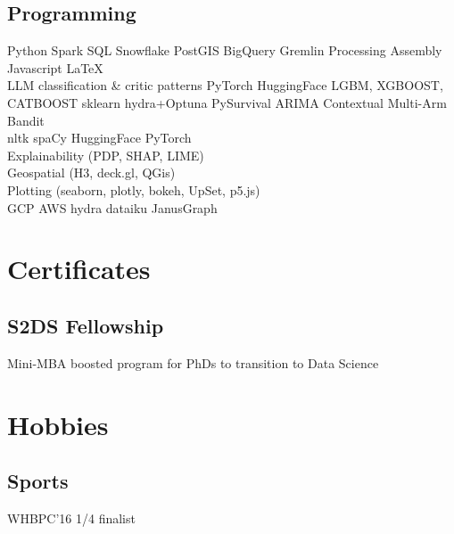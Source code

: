 \documentclass[a4paper]{deedy-resume} %
\begin{document}
\begin{minipage}[t]{0.28\textwidth}
\subsection{Programming}

Python \textbullet{} Spark \textbullet{} SQL \textbullet{} Snowflake \textbullet{}
PostGIS  \textbullet{} BigQuery \textbullet{} Gremlin \textbullet{}
Processing \textbullet{} Assembly \textbullet{} Javascript \textbullet{} \LaTeX\\
LLM classification \& critic patterns \textbullet{}
PyTorch \textbullet{} HuggingFace \textbullet{}
LGBM, XGBOOST, CATBOOST \textbullet{} sklearn \textbullet{}
hydra+Optuna \textbullet{}
PySurvival \textbullet{} ARIMA \textbullet{} Contextual Multi-Arm Bandit  \\
nltk \textbullet{} spaCy \textbullet{} HuggingFace \textbullet{} PyTorch\\
Explainability (PDP, SHAP, LIME) \textbullet{}\\
Geospatial (H3, deck.gl, QGis) \textbullet{} \\
Plotting (seaborn, plotly, bokeh, UpSet, p5.js)\\
GCP \textbullet{} AWS \textbullet{} hydra \textbullet{} dataiku \textbullet{} JanusGraph

\sectionspace %



\section{Certificates}

\subsection{S2DS Fellowship}
Mini-MBA boosted program for PhDs to transition to Data Science

\sectionspace %


\section{Hobbies}
\subsection{Sports}
WHBPC'16 1/4 finalist


\end{minipage}
\end{document}
